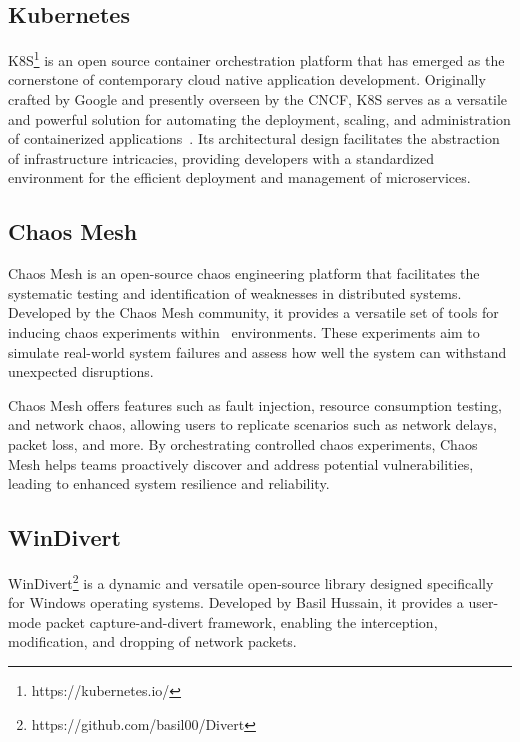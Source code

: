 \subsection{Kubernetes}
\label{subsec:kubernetes}
\acf{K8S}\footnote{https://kubernetes.io/} is an open source container orchestration platform that has emerged as the cornerstone of contemporary cloud native application development. Originally crafted by Google and presently overseen by the \ac{CNCF}, \ac{K8S} serves as a versatile and powerful solution for automating the deployment, scaling, and administration of containerized applications~\cite{burns2022kubernetes}. Its architectural design facilitates the abstraction of infrastructure intricacies, providing developers with a standardized environment for the efficient deployment and management of microservices.~\cite{noauthor_production-grade_nodate}


\subsection{Chaos Mesh}
\label{subsec:chaosmesh}
Chaos Mesh is an open-source chaos engineering platform that facilitates the systematic testing and identification of weaknesses in distributed systems. Developed by the Chaos Mesh community, it provides a versatile set of tools for inducing chaos experiments within~ environments. These experiments aim to simulate real-world system failures and assess how well the system can withstand unexpected disruptions.

Chaos Mesh offers features such as fault injection, resource consumption testing, and network chaos, allowing users to replicate scenarios such as network delays, packet loss, and more. By orchestrating controlled chaos experiments, Chaos Mesh helps teams proactively discover and address potential vulnerabilities, leading to enhanced system resilience and reliability.~\cite{noauthor_chaos_nodate}

\subsection{WinDivert}
\label{subsec:windivert}
WinDivert\footnote{https://github.com/basil00/Divert} is a dynamic and versatile open-source library designed specifically for Windows operating systems. Developed by Basil Hussain, it provides a user-mode packet capture-and-divert framework, enabling the interception, modification, and dropping of network packets.

